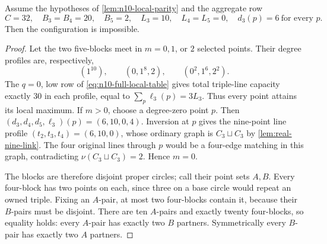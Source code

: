 \begin{lemma}\label{lem:n10-golden-link-endpoint}
Assume the hypotheses of \cref{lem:n10-local-parity} and the aggregate row
\begin{equation}\label{eq:n10-k2-endpoint-row}
 C=32,\quad B_3=B_4=20,\quad B_5=2,\quad
 L_3=10,\quad L_4=L_5=0,
 \quad d_3(p)=6\ \text{for every }p.
\end{equation}
Then the configuration is impossible.
\end{lemma}

\begin{proof}
Let the two five-blocks meet in $m=0,1$, or $2$ selected points.  Their
degree profiles are, respectively,
\begin{equation}\label{eq:n10-k2-degree-profiles}
 (1^{10}),\qquad(0,1^8,2),\qquad(0^2,1^6,2^2).
\end{equation}
The $q=0$, low row of \eqref{eq:n10-full-local-table} gives total
triple-line capacity exactly $30$ in each profile, equal to
$\sum_p\ell_3(p)=3L_3$.  Thus every point attains its local maximum.  If
$m>0$, choose a degree-zero point $p$.  Then
$(d_3,d_4,d_5,\ell_3)(p)=(6,10,0,4)$.  Inversion at $p$ gives the
nine-point line profile $(t_2,t_3,t_4)=(6,10,0)$, whose ordinary graph is
$C_3\sqcup C_3$ by \cref{lem:real-nine-link}.  The four original lines
through $p$ would be a four-edge matching in this graph, contradicting
$\nu(C_3\sqcup C_3)=2$.  Hence $m=0$.

The blocks are therefore disjoint proper circles; call their point sets
$A,B$.  Every four-block has two points on each, since three on a base
circle would repeat an owned triple.  Fixing an $A$-pair, at most two
four-blocks contain it, because their $B$-pairs must be disjoint.  There
are ten $A$-pairs and exactly twenty four-blocks, so equality holds: every
$A$-pair has exactly two $B$ partners.  Symmetrically every $B$-pair has
exactly two $A$ partners.


\end{proof}
